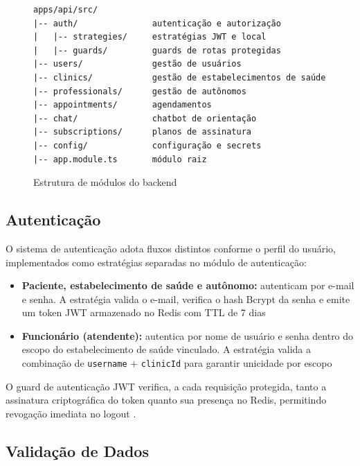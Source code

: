 \begin{figure}[H]
  \centering
  \caption{Estrutura de módulos do backend}
  \label{fig:backend-modules}
\begin{verbatim}
apps/api/src/
|-- auth/               autenticação e autorização
|   |-- strategies/     estratégias JWT e local
|   |-- guards/         guards de rotas protegidas
|-- users/              gestão de usuários
|-- clinics/            gestão de estabelecimentos de saúde
|-- professionals/      gestão de autônomos
|-- appointments/       agendamentos
|-- chat/               chatbot de orientação
|-- subscriptions/      planos de assinatura
|-- config/             configuração e secrets
|-- app.module.ts       módulo raiz
\end{verbatim}
\end{figure}

\subsection{Autenticação}
\label{subsec:auth}

O sistema de autenticação adota fluxos distintos
conforme o perfil do usuário, implementados como
estratégias separadas no módulo de autenticação:

\begin{itemize}
  \item \textbf{Paciente, estabelecimento de saúde e autônomo:}
        autenticam por e-mail e senha. A estratégia
        valida o e-mail, verifica o hash Bcrypt da
        senha e emite um token JWT armazenado no
        Redis com TTL de 7 dias
  \item \textbf{Funcionário (atendente):}
        autentica por nome de usuário e senha dentro
        do escopo do estabelecimento de saúde vinculado. A estratégia
        valida a combinação de \texttt{username} +
        \texttt{clinicId} para garantir unicidade
        por escopo
\end{itemize}

O guard de autenticação JWT verifica,
a cada requisição protegida, tanto a assinatura
criptográfica do token quanto sua presença no Redis,
permitindo revogação imediata no logout
\cite{rfc7519}.

\subsection{Validação de Dados}
\label{subsec:backend-validation}

